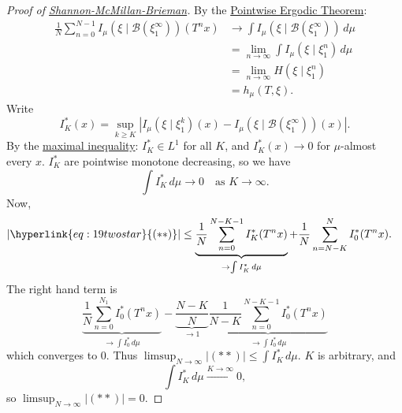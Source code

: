\documentclass{article}
\begin{document}
\begin{proof}[Proof of \hyperlink{def:smb}{Shannon-McMillan-Brieman}]
  By the \hyperlink{thm:pet}{Pointwise Ergodic Theorem}:
  \begin{align*}
    \frac{1}{N} \sum_{n=0}^{N-1} I_\mu(\xi \mid \mathcal{B}(\xi_1^\infty))(T^n x) &\to \int I_\mu(\xi \mid \mathcal{B}(\xi_1^\infty)) \, d\mu \\
                                                                                  &=\lim_{n\to\infty} \int I_\mu(\xi \mid \xi_1^n) \, d\mu \\
                                                                                  &=\lim_{n\to\infty} H(\xi \mid \xi_1^n) \\
                                                                                  &= h_\mu(T, \xi).
  \end{align*}
  Write
  \begin{equation*}
    I_K^*(x) = \sup_{k \geq K} \left\lvert I_\mu\left(\xi \mid \xi_1^k\right)(x) - I_\mu\left(\xi \mid \mathcal{B}(\xi_1^\infty)\right)(x)\right\rvert.
  \end{equation*}
  By the \hyperlink{thm:maxineq}{maximal inequality}: $I_K^* \in L^1$ for all $K$, and $I_K^*(x) \to 0$ for $\mu$-almost every $x$.
  $I_K^*$ are pointwise monotone decreasing, so we have
  \begin{equation*}
    \int I_K^* \, d\mu \to 0 \quad \text{as } K \to \infty.
  \end{equation*}
  Now,
  \begin{align*}
    |\hyperlink{eq:19twostar}{(**)}| &\leq \underbrace{\frac{1}{N} \sum_{n=0}^{N-K-1} I_K^*(T^n x)}_{\to \int I_K^* \, d\mu} + \frac{1}{N} \sum_{n=N-K}^{N} I_0^*(T^n x).
  \end{align*}
  The right hand term is
  \begin{equation*}
    \underbrace{\frac{1}{N} \sum_{n=0}^{N_1} I_0^* (T^n x)}_{\to \int\!I_0^* \, d\mu} - \underbrace{\frac{N-K}{N}}_{\to 1} \underbrace{\frac{1}{N-K} \sum_{n=0}^{N-K-1} I_0^*(T^n x)}_{\to \int\!I_0^*\,d\mu}
  \end{equation*}
  which converges to 0.
  Thus $\limsup_{N \to \infty} |(**)| \leq \int I_K^*\,d\mu$.
  $K$ is arbitrary, and
  \begin{equation*}\int I_K^* \, d\mu \xrightarrow{K \to\infty}0,\end{equation*}
  so $\limsup_{N \to \infty} |(**)| = 0$.
\end{proof}
\printindex
\end{document}
